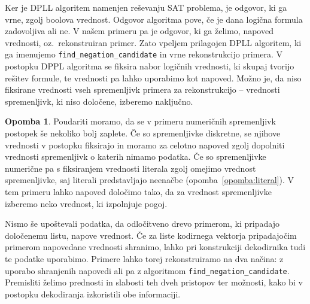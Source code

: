 \documentclass[12pt,a4paper,twoside]{article}
\theoremstyle{definition} %
\newtheorem{opomba}[definicija]{Opomba}
\theoremstyle{plain} %
\numberwithin{equation}{section}  %
\begin{document}
Ker je DPLL algoritem namenjen reševanju SAT problema, je odgovor, ki ga vrne, zgolj boolova vrednost.
Odgovor algoritma pove, če je dana logična formula zadovoljiva ali ne.
V našem primeru pa je odgovor, ki ga želimo, napoved vrednosti, oz.\ rekonstruiran primer.
Zato vpeljem prilagojen DPLL algoritem, ki ga imenujemo \texttt{find\_\-negation\_\-candidate} in vrne rekonstrukcijo primera.
V postopku DPPL algoritma se fiksira nabor logičnih vrednosti, ki skupaj tvorijo rešitev formule, te vrednosti pa lahko uporabimo kot napoved. %
Možno je, da niso fiksirane vrednosti vseh spremenljivk primera za rekonstrukcijo -- vrednosti spremenljivk, ki niso določene, izberemo naključno.

\begin{opomba}
	Poudariti moramo, da se v primeru numeričnih spremenljivk postopek še nekoliko bolj zaplete.
	Če so spremenljivke diskretne, se njihove vrednosti v postopku fiksirajo in moramo za celotno napoved zgolj dopolniti vrednosti spremenljivk o katerih nimamo podatka.
	Če so spremenljivke numerične pa s fiksiranjem vrednosti literala zgolj omejimo vrednost spremenljivke, saj literali predstavljajo neenačbe (opomba~\ref{opomba:literal}).
	V tem primeru lahko napoved določimo tako, da za vrednost spremenljivke izberemo neko vrednost, ki izpolnjuje pogoj.
\end{opomba}

Nismo še upoštevali podatka, da odločitveno drevo primerom, ki pripadajo določenemu listu, napove vrednost.
Če za liste kodirnega vektorja pripadajočim primerom napovedane vrednosti shranimo, lahko pri konstrukciji dekodirnika tudi te podatke uporabimo.
Primere lahko torej rekonstruiramo na dva načina: z uporabo shranjenih napovedi ali pa z algoritmom \texttt{find\_\-negation\_\-candidate}.
Premisliti želimo prednosti in slabosti teh dveh pristopov ter možnosti, kako bi v postopku dekodiranja izkoristili obe informaciji.
\end{document}
